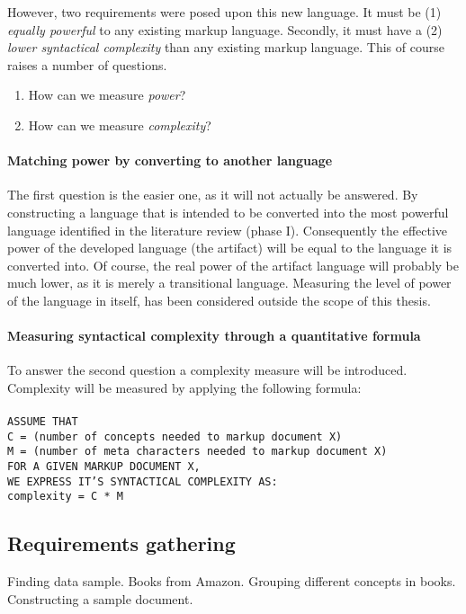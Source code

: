 \documentclass{scrreprt}
\newcommand{\tab}{\hspace*{6pt}}
\newcommand{\tabb}{\tab\tab}
\begin{document}
However, two requirements were posed upon this new language. It must be (1) \emph{equally powerful} to any existing markup language. Secondly, it must have a (2) \emph{lower syntactical complexity} than any existing markup language. This of course raises a number of questions.



\begin{enumerate}
\item How can we measure \emph{power}?
\item How can we measure \emph{complexity}?
\end{enumerate}

\paragraph{Matching power by converting to another language}
The first question is the easier one, as it will not actually be answered. By constructing a language that is intended to be converted into the most powerful language identified in the literature review (phase I). Consequently the effective power of the developed language (the artifact) will be equal to the language it is converted into. Of course, the real power of the artifact language will probably be much lower, as it is merely a transitional language. Measuring the level of power of the language in itself, has been considered outside the scope of this thesis.

\paragraph{Measuring syntactical complexity through a quantitative formula}
To answer the second question a complexity measure will be introduced. Complexity will be measured by applying the following formula:\\\\
\texttt{ASSUME THAT}\\
\texttt{\tabb C = (number of concepts needed to markup document X) }\\
\texttt{\tabb M = (number of meta characters needed to markup document X) }\\
\texttt{FOR A GIVEN MARKUP DOCUMENT X, }\\
\texttt{WE EXPRESS IT'S SYNTACTICAL COMPLEXITY AS: }\\
\texttt{\tabb complexity = C * M }


\subsection{Requirements gathering}
Finding data sample. Books from Amazon.
Grouping different concepts in books.
Constructing a sample document.
\end{document}
